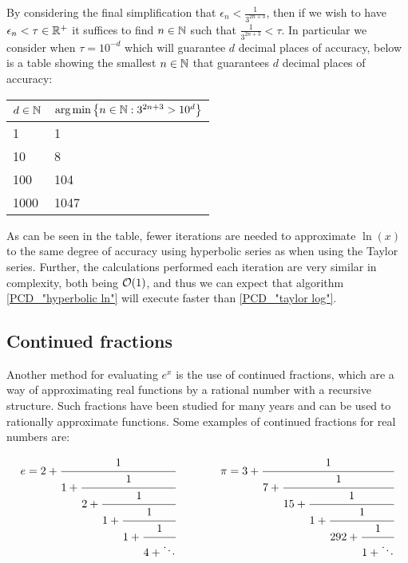 By considering the final simplification that \(\epsilon_n < \frac{1}{3^{2n+3}}\), then if we wish to have \(\epsilon_n < \tau \in \mathbb{R}^+\) it suffices to find \(n \in \mathbb{N}\) such that \(\frac{1}{3^{2n+3}} < \tau\). In particular we consider when \(\tau = 10^{-d}\) which will guarantee \(d\) decimal places of accuracy, below is a table showing the smallest \(n \in \mathbb{N}\) that guarantees \(d\) decimal places of accuracy:

\begin{center}
\begin{tabular}{|l|l|}
\hline
\(d \in \mathbb{N}\) 
	& \(\textrm{arg}\min\left\{n \in \mathbb{N} : 3^{2n+3} > 10^d\right\}\)\\\hline
1 & 1\\\hline
10 & 8\\\hline
100 & 104\\\hline
1000 & 1047\\\hline
\end{tabular}
\end{center}

As can be seen in the table, fewer iterations are needed to approximate \(\ln(x)\) to the same degree of accuracy using hyperbolic series as when using the Taylor series. Further, the calculations performed each iteration are very similar in complexity, both being \(\mathcal{O}(1)\), and thus we can expect that algorithm \ref{PCD_"hyperbolic ln"} will execute faster than \ref{PCD_"taylor log"}.

\subsection{Continued fractions}

\theoremstyle{plain}
\newtheorem{equiv cont frac}{Proposition}[subsection]
\newtheorem{odd even conv}[equiv cont frac]{Proposition}

Another method for evaluating \(e^x\) is the use of continued fractions, which are a way of approximating real functions by a rational number\cite{BOK_ContFrac} with a recursive structure. Such fractions have been studied for many years and can be used to rationally approximate functions. Some examples of continued fractions for real numbers are\cite[][266]{BOK_ContFrac}:

\begin{displaymath}
\begin{array}{c@{\hspace{4em}}c}
e = 2 + \cfrac{1}{1 +
	    \cfrac{1}{2 +
		\cfrac{1}{1 +
		\cfrac{1}{1 +
		\cfrac{1}{4 + \ddots} } } } }&
\pi = 3 + \cfrac{1}{7 + 
		  \cfrac{1}{15 +
		  \cfrac{1}{1 + 
		  \cfrac{1}{292 +
		  \cfrac{1}{1 + \ddots} } } } }
\end{array}
\end{displaymath}

